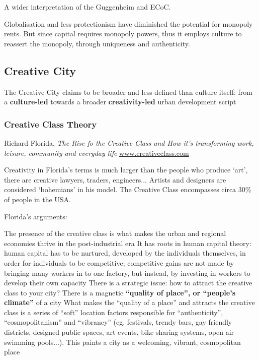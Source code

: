 \documentclass{article}
\begin{document}
A wider interpretation of the Guggenheim and ECoC.

Globalisation and less protectionism have diminished the potential for monopoly rents. But since capital requires monopoly powers, thus it employs culture to reassert the monopoly, through uniqueness and authenticity. 


\subsection{Creative City}

The Creative City claims to be broader and less defined than culture itself: from a \textbf{culture-led} towards a broader \textbf{creativity-led} urban development script

\subsubsection{Creative Class Theory}

Richard Florida, \textit{The Rise fo the Creative Class and How it's transforming work, leisure, community and everyday life} \url{www.creativeclass.com}

Creativity in Florida's terms is much larger than the people who produce `art', there are creative lawyers, traders, engineers... Artists and designers are considered `bohemians' in his model. The Creative Class encompasses circa 30\% of people in the USA.

Florida's arguments:

\begin{outline}
	\1 The presence of the creative class is what makes the urban and regional economies thrive in the post-industrial era
		\2 It has roots in human capital theory: human capital has to be nurtured, developed by the individuals themselves, in order for individuals to be competitive; competitive gains are not made by bringing many workers in to one factory, but instead, by investing in workers to develop their own capacity
	\1 There is a strategic issue: how to attract the creative class to your city? There is a magnetic \textbf{``quality of place'', or ``people's climate''} of a city
		\2 What makes the ``quality of a place'' and attracts the creative class is a series of ``soft'' location factors responsible for ``authenticity'', ``cosmopolitanism'' and ``vibrancy'' (eg. festivals, trendy bars, gay friendly districts, designed public spaces, art events, bike sharing systems, open air swimming pools...). This paints a city as a welcoming, vibrant, cosmopolitan place
\end{outline}
		
\end{document}
